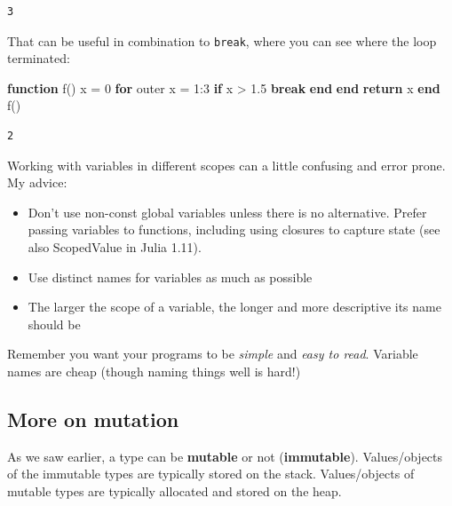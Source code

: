 \documentclass[
]{article}
\newenvironment{Shaded}{\begin{snugshade}}{\end{snugshade}}
\newcommand{\ControlFlowTok}[1]{\textcolor[rgb]{0.00,0.23,0.31}{\textbf{#1}}}
\newcommand{\FloatTok}[1]{\textcolor[rgb]{0.68,0.00,0.00}{#1}}
\newcommand{\FunctionTok}[1]{\textcolor[rgb]{0.28,0.35,0.67}{#1}}
\newcommand{\KeywordTok}[1]{\textcolor[rgb]{0.00,0.23,0.31}{\textbf{#1}}}
\newcommand{\NormalTok}[1]{\textcolor[rgb]{0.00,0.23,0.31}{#1}}
\newcommand{\OperatorTok}[1]{\textcolor[rgb]{0.37,0.37,0.37}{#1}}
\providecommand{\tightlist}{%
  \setlength{\itemsep}{0pt}\setlength{\parskip}{0pt}}
\begin{document}
\begin{verbatim}
3
\end{verbatim}

That can be useful in combination to \texttt{break}, where you can see
where the loop terminated:

\begin{Shaded}
\begin{Highlighting}[]
\KeywordTok{function} \FunctionTok{f}\NormalTok{()}
\NormalTok{   x }\OperatorTok{=} \FloatTok{0}
   \ControlFlowTok{for}\NormalTok{ outer x }\OperatorTok{=} \FloatTok{1}\OperatorTok{:}\FloatTok{3}
   \ControlFlowTok{if}\NormalTok{ x }\OperatorTok{\textgreater{}} \FloatTok{1.5}
   \ControlFlowTok{break}
   \ControlFlowTok{end}
   \ControlFlowTok{end}
   \ControlFlowTok{return}\NormalTok{ x}
\KeywordTok{end}
\FunctionTok{f}\NormalTok{()}
\end{Highlighting}
\end{Shaded}

\begin{verbatim}
2
\end{verbatim}

Working with variables in different scopes can a little confusing and
error prone. My advice:

\begin{itemize}
\tightlist
\item
  Don't use non-const global variables unless there is no alternative.
  Prefer passing variables to functions, including using closures to
  capture state (see also ScopedValue in Julia 1.11).
\item
  Use distinct names for variables as much as possible
\item
  The larger the scope of a variable, the longer and more descriptive
  its name should be
\end{itemize}

Remember you want your programs to be \emph{simple} and \emph{easy to
read}. Variable names are cheap (though naming things well is hard!)

\subsection{More on mutation}\label{more-on-mutation}

As we saw earlier, a type can be \textbf{mutable} or not
(\textbf{immutable}). Values/objects of the immutable types are
typically stored on the stack. Values/objects of mutable types are
typically allocated and stored on the heap.
\end{document}
